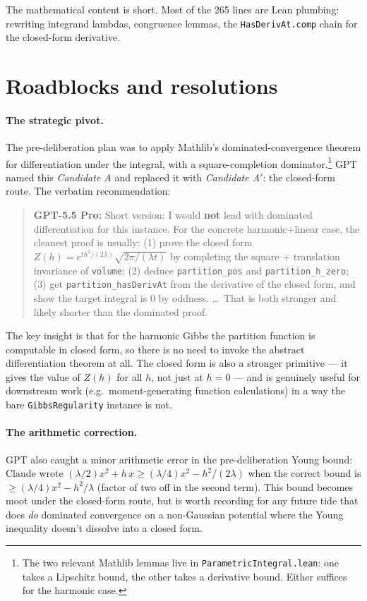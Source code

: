 \documentclass[11pt]{article}
\newcommand{\gptbox}[1]{\par\medskip\begin{quote}\small\textbf{\textcolor{green!50!black}{GPT-5.5 Pro:}} #1\end{quote}\medskip}
\begin{document}
The mathematical content is short. Most of the 265 lines are Lean
plumbing: rewriting integrand lambdas, congruence lemmas, the
\texttt{HasDerivAt.comp} chain for the closed-form derivative.

\section{Roadblocks and resolutions}

\paragraph{The strategic pivot.} The pre-deliberation plan was to
apply Mathlib's dominated-convergence theorem for differentiation
under the integral, with a square-completion
dominator.\footnote{The two relevant Mathlib lemmas live in
\texttt{ParametricIntegral.lean}: one takes a Lipschitz bound, the
other takes a derivative bound. Either suffices for the harmonic
case.} GPT
named this \emph{Candidate A} and replaced it with \emph{Candidate
A$'$}: the closed-form route. The verbatim recommendation:

\gptbox{Short version: I would \textbf{not} lead with dominated
differentiation for this instance. For the concrete harmonic+linear
case, the cleanest proof is usually: (1) prove the closed form
$Z(h) = e^{t h^2/(2\lambda)} \sqrt{2\pi/(\lambda t)}$ by completing
the square + translation invariance of \texttt{volume}; (2) deduce
\texttt{partition\_pos} and \texttt{partition\_h\_zero}; (3) get
\texttt{partition\_hasDerivAt} from the derivative of the closed
form, and show the target integral is $0$ by oddness. \dots\ That is
both stronger and likely shorter than the dominated proof.}

The key insight is that for the harmonic Gibbs the partition
function is computable in closed form, so there is no need to invoke
the abstract differentiation theorem at all. The closed form is also
a stronger primitive --- it gives the value of $Z(h)$ for all $h$,
not just at $h = 0$ --- and is genuinely useful for downstream work
(e.g.\ moment-generating function calculations) in a way the bare
\texttt{GibbsRegularity} instance is not.

\paragraph{The arithmetic correction.} GPT also caught a minor
arithmetic error in the pre-deliberation Young bound: Claude wrote
$(\lambda/2)x^2 + h\,x \ge (\lambda/4)x^2 - h^2/(2\lambda)$ when the
correct bound is $\ge (\lambda/4)x^2 - h^2/\lambda$ (factor of two
off in the second term). This bound becomes moot under the
closed-form route, but is worth recording for any future tide that
does \emph{do} dominated convergence on a non-Gaussian potential
where the Young inequality doesn't dissolve into a closed form.
\end{document}
